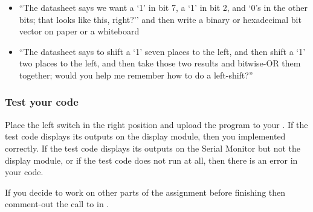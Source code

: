 {\begin{itemize}
\begin{itemize}
\begin{itemize}
                        \item ``The datasheet says we want a `1' in bit 7, a `1' in bit 2, and `0's in the other bits; that looks like this, right?'' and then write a binary or hexadecimal bit vector on paper or a whiteboard
                        \item ``The datasheet says to shift a `1' seven places to the left, and then shift a `1' two places to the left, and then take those two results and bitwise-OR them together; would you help me remember how to do a left-shift?''
                    \end{itemize}
            \end{itemize}
    \end{itemize}
}{}

\subsubsection*{Test your code}

Place the left switch in the right position and upload the program to your \developmentboard.
If the test code displays its outputs on the display module, then you implemented  correctly.
If the test code displays its outputs on the Serial Monitor but not the display module, or if the test code does not run at all, then there is an error in your code.

\vspace{1cm}

If you decide to work on other parts of the assignment before finishing  then comment-out the call to  in .
